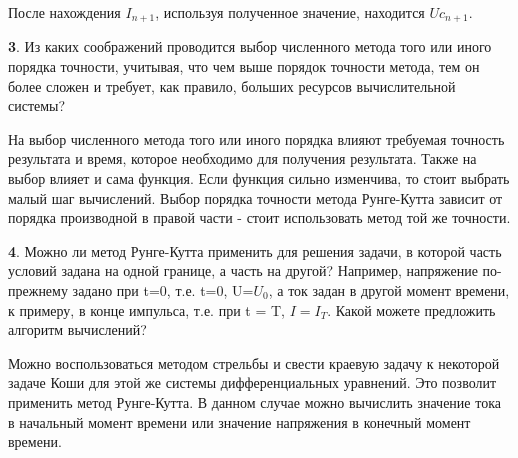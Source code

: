 \documentclass[a4paper,oneside,12pt]{extreport}
\begin{document}
\begin{figure}[ht!]
\end{figure}

После нахождения $I_{n+1}$, используя полученное значение, находится $Uc_{n+1}$. 

\textbf{3}. Из каких соображений проводится выбор численного метода того или иного порядка
точности, учитывая, что чем выше порядок точности метода, тем он более сложен 
и требует, как правило, больших ресурсов вычислительной системы?

На выбор численного метода того или иного порядка влияют требуемая точность результата
и время, которое необходимо для получения результата.
Также на выбор влияет и сама функция.
Если функция сильно изменчива, то стоит выбрать малый шаг вычислений.
Выбор порядка точности метода Рунге-Кутта зависит от порядка производной в правой части - 
стоит использовать метод той же точности.

\textbf{4}. Можно ли метод Рунге-Кутта применить для решения задачи, в которой часть условий
задана на одной границе, а часть на другой?
Например, напряжение по-прежнему задано при t=0, т.е. t=0, U=$U_0$, 
а ток задан в другой момент времени, к примеру, в конце импульса, т.е. при 
t = T, $I=I_T$.  Какой можете предложить алгоритм вычислений?

Можно воспользоваться методом стрельбы и свести краевую задачу к некоторой задаче 
Коши для этой же системы дифференциальных уравнений.
Это позволит применить метод Рунге-Кутта.
В данном случае можно вычислить значение тока в начальный момент
времени или значение напряжения в конечный момент времени.
\end{document}
